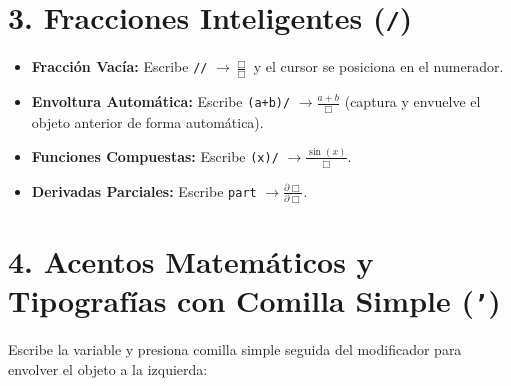 \documentclass[11pt,book,spanish,alphabetic]{apuntes-scr}
\begin{document}
\section{3. Fracciones Inteligentes (\texttt{/})}
\begin{itemize}[leftmargin=8mm]
    \item \textbf{Fracción Vacía:} Escribe \texttt{//} $\to \frac{\Box}{\Box}$ y el cursor se posiciona en el numerador.
    \item \textbf{Envoltura Automática:} Escribe \texttt{(a+b)/} $\to \frac{a+b}{\Box}$ (captura y envuelve el objeto anterior de forma automática).
    \item \textbf{Funciones Compuestas:} Escribe \texttt{\string\sin(x)/} $\to \frac{\sin(x)}{\Box}$.
    \item \textbf{Derivadas Parciales:} Escribe \texttt{part} $\to \frac{\partial \Box}{\partial \Box}$.
\end{itemize}

\section{4. Acentos Matemáticos y Tipografías con Comilla Simple (\texttt{'})}
Escribe la variable y presiona comilla simple seguida del modificador para envolver el objeto a la izquierda:
\end{document}
